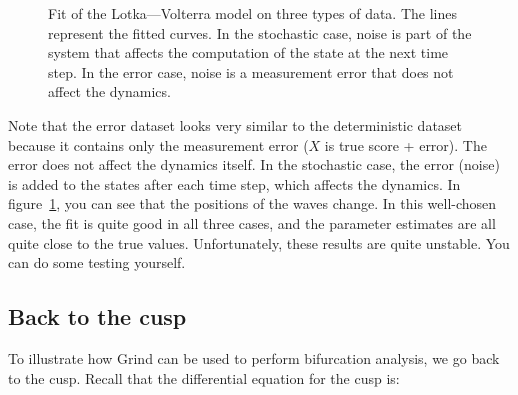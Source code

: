 \documentclass[
  a4paper,
  DIV=11,
  numbers=noendperiod,
  oneside]{scrreprt}
\begin{document}
\begin{figure}


\caption{\label{fig-ch4n-img1-old-49}Fit of the Lotka---Volterra model
on three types of data. The lines represent the fitted curves. In the
stochastic case, noise is part of the system that affects the
computation of the state at the next time step. In the error case, noise
is a measurement error that does not affect the dynamics.}

\end{figure}%

Note that the error dataset looks very similar to the deterministic
dataset because it contains only the measurement error (\(X\) is true
score + error). The error does not affect the dynamics itself. In the
stochastic case, the error (noise) is added to the states after each
time step, which affects the dynamics. In
figure~\ref{fig-ch4n-img1-old-49}, you can see that the positions of the
waves change. In this well-chosen case, the fit is quite good in all
three cases, and the parameter estimates are all quite close to the true
values. Unfortunately, these results are quite unstable. You can do some
testing yourself.

\subsection{Back to the cusp}\label{sec-Back-to-the-cusp}

To illustrate how Grind can be used to perform bifurcation analysis, we
go back to the cusp. Recall that the differential equation for the cusp
is:
\end{document}
